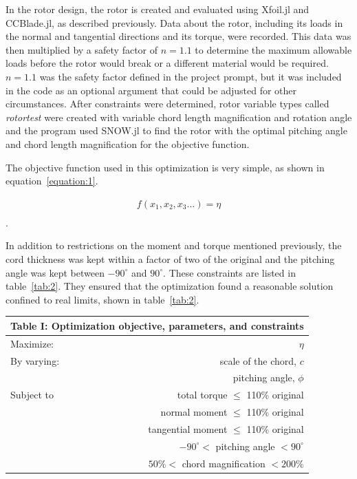 \documentclass[journal ]{new-aiaa}
\begin{document}
In the rotor design, the rotor is created and evaluated using Xfoil.jl and CCBlade.jl, as described previously. Data about the rotor, including its loads in the normal and tangential directions and its torque, were recorded. This data was then multiplied by a safety factor of $n=1.1$ to determine the maximum allowable loads before the rotor would break or a different material would be required. $n=1.1$ was the safety factor defined in the project prompt, but it was included in the code as an optional argument that could be adjusted for other circumstances. After constraints were determined, rotor variable types called \emph{rotortest} were created with variable chord length magnification and rotation angle and the program used SNOW.jl to find the rotor with the optimal pitching angle and chord length magnification for the objective function.

The objective function used in this optimization is very simple, as shown in equation~\eqref{equation:1}. 

\begin{equation}
	\begin{aligned}
	\label{equation:1}
	f(x_{1}, x_{2}, x_{3}...) = \eta \\
	\end{aligned}
\end{equation}.

In addition to restrictions on the moment and torque mentioned previously, the cord thickness was kept within a factor of two of the original and the pitching angle was kept between $-90^{\circ}$ and $90^{\circ}$. These constraints are listed in table~\eqref{tab:2}. They ensured that the optimization found a reasonable solution confined to real limits, shown in table~\eqref{tab:2}.

\begin{center}
\label{tab:2}
\begin{tabular}{l  r}
	 \multicolumn{2}{c}{Table I: Optimization objective, parameters, and constraints}  \\ \hline
  	Maximize: & $\eta$ \\ \hline
  	By varying: & scale of the chord, $c$ \\ 
  	 & pitching angle, $\phi$ \\  \hline
  	Subject to & total torque $\leq$ 110\% original \\ 
	 & normal moment $\leq$ 110\% original \\ 
	 & tangential moment $\leq$ 110\% original \\ 
	 & $-90^{\circ} <$ pitching angle $< 90^{\circ}$ \\
	 & $50\% <$ chord magnification $< 200\% $ \\ \hline
\end{tabular}
\end{center}
\end{document}
